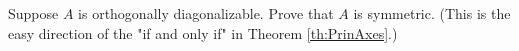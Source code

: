 \documentclass{ximera}
\begin{document}
\begin{problem}






\end{problem}

\begin{problem}\label{prob:ortho_diag_implies_symmetric}
Suppose $A$ is orthogonally diagonalizable.  Prove that $A$ is symmetric.  (This is the easy direction of the "if and only if" in Theorem \ref{th:PrinAxes}.)
\end{problem}
\end{document}
